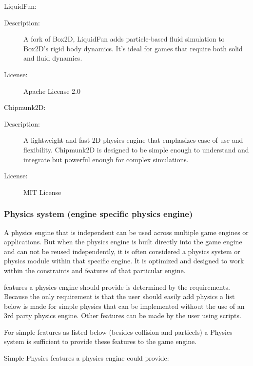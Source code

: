 \documentclass{projdoc}
\begin{document}
LiquidFun:
\begin{description}
	\item[Description:] A fork of Box2D, LiquidFun adds particle-based fluid simulation to Box2D's rigid body dynamics. It’s ideal for games that require both solid and fluid dynamics.
	\item[License:] Apache License 2.0
\end{description}

Chipmunk2D:
\begin{description}
	\item[Description:] A lightweight and fast 2D physics engine that emphasizes ease of use and flexibility. Chipmunk2D is designed to be simple enough to understand and integrate but powerful enough for complex simulations.
	\item[License:] MIT License
\end{description}


\subsubsection{Physics system (engine specific physics engine)}
A physics engine that is independent can be used across multiple game engines or applications. But when the physics engine is built directly into the game engine and can not be reused independently, it is often considered a physics system or physics module within that specific engine. It is optimized and designed to work within the constraints and features of that particular engine.

features a physics engine should provide is determined by the requirements.
Because the only requirement is that the user should easily add physics a list below is made for simple physics that can be implemented without the use of an 3rd party physics engine. Other features can be made by the user using scripts.

For simple features as listed below (besides collision and particels) a Physics system is sufficient to provide these features to the game engine.

Simple Physics features a physics engine could provide:
\end{document}

